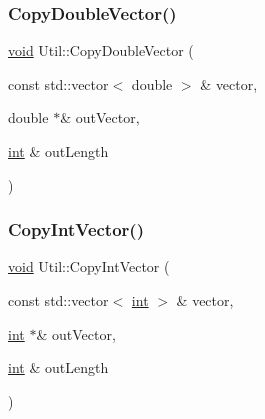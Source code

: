 \mbox{\label{class_l_i_b___l_a_1_1_util_ae10f61bed0b7b90544034596d4d551d2}} 
\subsubsection{\texorpdfstring{Copy\+Double\+Vector()}{CopyDoubleVector()}}
{\footnotesize\ttfamily \hyperlink{lp__lib_8h_ac7828c7b2b31d2e11af17bdb6289c5d9}{void} Util\+::\+Copy\+Double\+Vector (\begin{DoxyParamCaption}\item[{const std\+::vector$<$ double $>$ \&}]{vector,  }\item[{double $\ast$\&}]{out\+Vector,  }\item[{\hyperlink{lp__lib_8h_adeb9ec6400320e4923ac9d836d509ddb}{int} \&}]{out\+Length }\end{DoxyParamCaption})\hspace{0.3cm}{\ttfamily [static]}}

\mbox{\label{class_l_i_b___l_a_1_1_util_a70a05277b916d83743d870b9da73ff0b}} 
\subsubsection{\texorpdfstring{Copy\+Int\+Vector()}{CopyIntVector()}}
{\footnotesize\ttfamily \hyperlink{lp__lib_8h_ac7828c7b2b31d2e11af17bdb6289c5d9}{void} Util\+::\+Copy\+Int\+Vector (\begin{DoxyParamCaption}\item[{const std\+::vector$<$ \hyperlink{lp__lib_8h_adeb9ec6400320e4923ac9d836d509ddb}{int} $>$ \&}]{vector,  }\item[{\hyperlink{lp__lib_8h_adeb9ec6400320e4923ac9d836d509ddb}{int} $\ast$\&}]{out\+Vector,  }\item[{\hyperlink{lp__lib_8h_adeb9ec6400320e4923ac9d836d509ddb}{int} \&}]{out\+Length }\end{DoxyParamCaption})\hspace{0.3cm}{\ttfamily [static]}}

